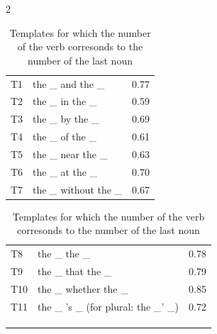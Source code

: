 \begin{multicols}{2}
\end{multicols}{2}



 
\begin{table}[t] 
\parbox{.45\linewidth}{
\centering
\begin{tabular}{ l l r }
  T1    & the \_ and the \_     &  0.77 \\
  T2    & the \_ in the \_      &  0.59 \\
  T3    & the \_ by the \_      &  0.69 \\
  T4    & the \_ of the \_      &  0.61 \\
  T5    & the \_ near the \_    &  0.63\\
  T6    & the \_ at the \_      &  0.70\\
  T7    & the \_ without the \_ & 0.67  \\
\end{tabular}
\caption{Templates for which the number of the verb 
is opposite to the number of the last noun} 
\label{tab:attractor_templates}
}
\hfill
\parbox{.45\linewidth}{
\centering
\begin{tabular}{ l l r }
  T8    & the \_ the \_         &  0.78\\
  T9    & the \_ that the \_    &  0.79\\
  T10   & the \_ whether the \_ &  0.85\\
  T11   & the \_ 's \_ (for plural: the \_' \_)          &  0.72 \\
\\
\\
\\
\end{tabular}
\caption{Templates for which the number of the verb 
corresonds to the number of the last noun} 
\label{tab:lastnoun_templates}
}
\end{table}

